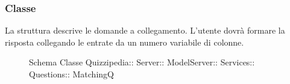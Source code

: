 \subsubsection{Classe }
La struttura descrive le domande a collegamento. L'utente dovrà formare la risposta collegando le entrate da un numero variabile di colonne.
\begin{figure}[H]
\centering
\noindent{}
\caption[Schema Classe MatchingQ]{Schema Classe Quizzipedia:: Server:: ModelServer:: Services:: Questions:: MatchingQ}
\end{figure}
